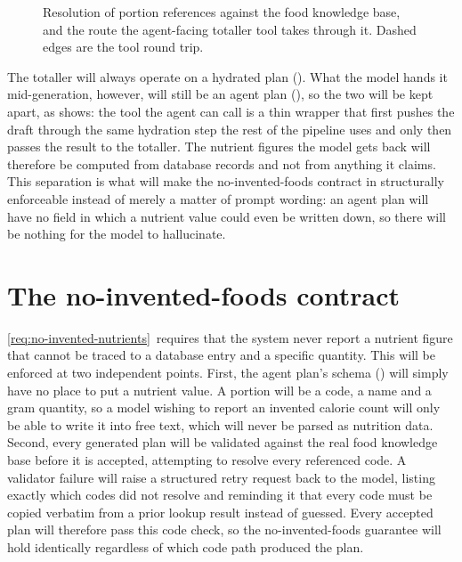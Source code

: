 \begin{figure}[p]
    \centering
    
    \caption{Resolution of portion references against the food knowledge base, and the route the agent-facing totaller tool takes through it. Dashed edges are the tool round trip.}
    \label{fig:diagram-hydration}
\end{figure}

The totaller will always operate on a hydrated plan (). What the model hands it mid-generation, however, will still be an agent plan (), so the two will be kept apart, as  shows: the tool the agent can call is a thin wrapper that first pushes the draft through the same hydration step the rest of the pipeline uses and only then passes the result to the totaller. The nutrient figures the model gets back will therefore be computed from database records and not from anything it claims. This separation is what will make the no-invented-foods contract in  structurally enforceable instead of merely a matter of prompt wording: an agent plan will have no field in which a nutrient value could even be written down, so there will be nothing for the model to hallucinate.

\section{The no-invented-foods contract}
\label{sec:design-no-invented-foods}

\ref{req:no-invented-nutrients}~requires that the system never report a nutrient figure that cannot be traced to a database entry and a specific quantity. This will be enforced at two independent points. First, the agent plan's schema () will simply have no place to put a nutrient value. A portion will be a code, a name and a gram quantity, so a model wishing to report an invented calorie count will only be able to write it into free text, which will never be parsed as nutrition data. Second, every generated plan will be validated against the real food knowledge base before it is accepted, attempting to resolve every referenced code. A validator failure will raise a structured retry request back to the model, listing exactly which codes did not resolve and reminding it that every code must be copied verbatim from a prior lookup result instead of guessed. Every accepted plan will therefore pass this code check, so the no-invented-foods guarantee will hold identically regardless of which code path produced the plan.

